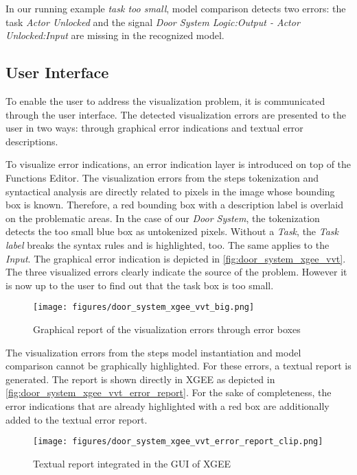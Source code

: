 In our running example \emph{task too small}, model comparison detects two errors: the task \emph{Actor Unlocked} and the signal \emph{Door System Logic:Output - Actor Unlocked:Input} are missing in the recognized model. 


\subsection{User Interface}
To enable the user to address the visualization problem, it is communicated through the user interface.
The detected visualization errors are presented to the user in two ways: through graphical error indications and textual error descriptions.

To visualize error indications, an error indication layer is introduced on top of the Functions Editor. The visualization errors from the steps tokenization and syntactical analysis are directly related to pixels in the image whose bounding box is known. Therefore, a red bounding box with a description label is overlaid on the problematic areas. In the case of our \emph{Door System}, the tokenization detects the too small blue box as untokenized pixels. Without a \emph{Task}, the \emph{Task label} breaks the syntax rules and is highlighted, too. The same applies to the \emph{Input}. The graphical error indication is depicted in \autoref{fig:door_system_xgee_vvt}.
The three visualized errors clearly indicate the source of the problem. However it is now up to the user to find out that the task box is too small. 

\begin{figure}[htb]
  \centering
  \texttt{[image: figures/door\_system\_xgee\_vvt\_big.png]}
  \caption{Graphical report of the visualization errors through error boxes}
  
  \label{fig:door_system_xgee_vvt}
\end{figure}

The visualization errors from the steps model instantiation and model comparison cannot be graphically highlighted. For these errors, a textual report is generated. The report is shown directly in XGEE as depicted in \autoref{fig:door_system_xgee_vvt_error_report}. For the sake of completeness, the error indications that are already highlighted with a red box are additionally added to the textual error report. 

\begin{figure}[htb]
  \centering
  \texttt{[image: figures/door\_system\_xgee\_vvt\_error\_report\_clip.png]}
  \caption{Textual report integrated in the GUI of XGEE}
  
  \label{fig:door_system_xgee_vvt_error_report}
\end{figure}



    